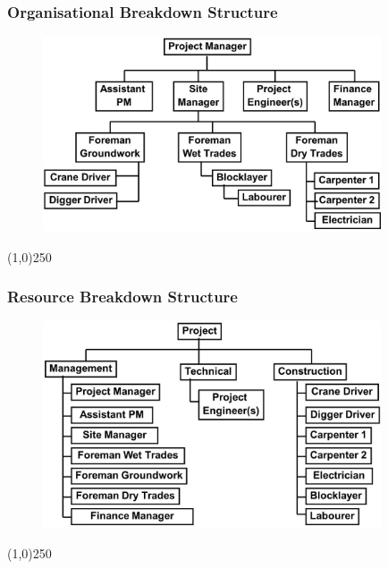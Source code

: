  
\begin{frame}
\frametitle{Organisational Breakdown Structure}
\begin{figure}
	\centering
		\includegraphics[width = 10cm]{images/obs.jpg}
	\label{fig:obs}
\end{figure}
\end{frame}\begin{center}\line(1,0){250}\end{center}


\begin{frame}
\frametitle{Resource Breakdown Structure}
\begin{figure}
	\centering
		\includegraphics[width = 10cm]{images/rbs.jpg}
	\label{fig:rbs}
\end{figure}
\end{frame}\begin{center}\line(1,0){250}\end{center}
 
